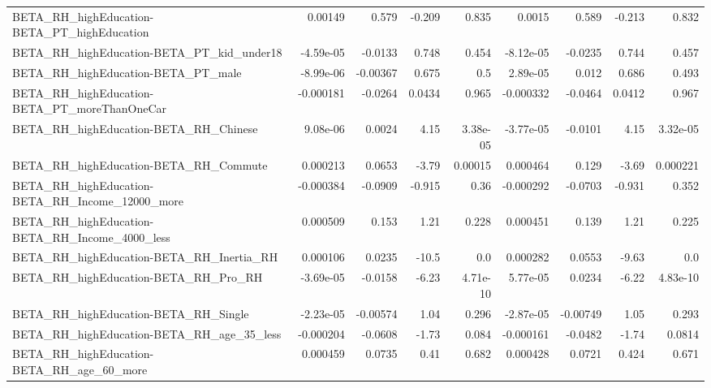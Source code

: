 \begin{tabular}{lrrrrrrrr}
BETA\_RH\_highEducation-BETA\_PT\_highEducation        &     0.00149 &        0.579 &   -0.209 &    0.835 &     0.0015 &       0.589 &       -0.213 &         0.832 \\
BETA\_RH\_highEducation-BETA\_PT\_kid\_under18          &   -4.59e-05 &      -0.0133 &    0.748 &    0.454 &  -8.12e-05 &     -0.0235 &        0.744 &         0.457 \\
BETA\_RH\_highEducation-BETA\_PT\_male                 &   -8.99e-06 &     -0.00367 &    0.675 &      0.5 &   2.89e-05 &       0.012 &        0.686 &         0.493 \\
BETA\_RH\_highEducation-BETA\_PT\_moreThanOneCar       &   -0.000181 &      -0.0264 &   0.0434 &    0.965 &  -0.000332 &     -0.0464 &       0.0412 &         0.967 \\
BETA\_RH\_highEducation-BETA\_RH\_Chinese              &    9.08e-06 &       0.0024 &     4.15 & 3.38e-05 &  -3.77e-05 &     -0.0101 &         4.15 &      3.32e-05 \\
BETA\_RH\_highEducation-BETA\_RH\_Commute              &    0.000213 &       0.0653 &    -3.79 &  0.00015 &   0.000464 &       0.129 &        -3.69 &      0.000221 \\
BETA\_RH\_highEducation-BETA\_RH\_Income\_12000\_more    &   -0.000384 &      -0.0909 &   -0.915 &     0.36 &  -0.000292 &     -0.0703 &       -0.931 &         0.352 \\
BETA\_RH\_highEducation-BETA\_RH\_Income\_4000\_less     &    0.000509 &        0.153 &     1.21 &    0.228 &   0.000451 &       0.139 &         1.21 &         0.225 \\
BETA\_RH\_highEducation-BETA\_RH\_Inertia\_RH           &    0.000106 &       0.0235 &    -10.5 &      0.0 &   0.000282 &      0.0553 &        -9.63 &           0.0 \\
BETA\_RH\_highEducation-BETA\_RH\_Pro\_RH               &   -3.69e-05 &      -0.0158 &    -6.23 & 4.71e-10 &   5.77e-05 &      0.0234 &        -6.22 &      4.83e-10 \\
BETA\_RH\_highEducation-BETA\_RH\_Single               &   -2.23e-05 &     -0.00574 &     1.04 &    0.296 &  -2.87e-05 &    -0.00749 &         1.05 &         0.293 \\
BETA\_RH\_highEducation-BETA\_RH\_age\_35\_less          &   -0.000204 &      -0.0608 &    -1.73 &    0.084 &  -0.000161 &     -0.0482 &        -1.74 &        0.0814 \\
BETA\_RH\_highEducation-BETA\_RH\_age\_60\_more          &    0.000459 &       0.0735 &     0.41 &    0.682 &   0.000428 &      0.0721 &        0.424 &         0.671 \\

\end{tabular}
